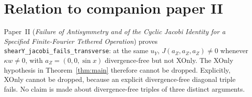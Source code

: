 \documentclass[11pt]{article}\emergencystretch=2em
\theoremstyle{definition}\newtheorem{definition}[theorem]{Definition}\theoremstyle{remark}\newtheorem{remark}[theorem]{Remark}
\begin{document}
\section{Relation to companion paper II}
Paper~II (\emph{Failure of Antisymmetry and of the Cyclic Jacobi Identity for a Specified Finite-Fourier Tethered Operation}) proves \texttt{shearY\_jacobi\_fails\_transverse}: at the same $u_Y$, $J(a_Z,a_Z,a_Z)\ne0$ whenever $\kappa w\ne0$, with $a_Z=(0,0,\sin x)$ divergence-free but not XOnly. The XOnly hypothesis in Theorem~\ref{thm:main} therefore cannot be dropped. Explicitly, XOnly cannot be dropped, because an explicit divergence-free diagonal triple fails. No claim is made about divergence-free triples of three distinct arguments.
\end{document}
